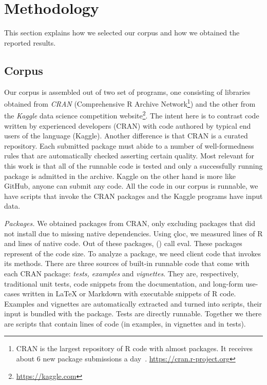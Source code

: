 \documentclass[screen,acmsmall]{acmart}
\newcommand{\mypara}[1]{\medskip\noindent\emph{#1}\xspace}
\begin{document}
\section{Methodology}

This section explains how we selected our corpus and how we obtained the
reported results.

\subsection{Corpus}

Our corpus is assembled out of two set of programs, one consisting of libraries
obtained from \emph{CRAN} (Comprehensive R Archive Network\footnote{CRAN is the
  largest repository of R code with almost \CranAvailablePackagesRnd packages.
  It receives about 6 new package submissions a day~\cite{Ligges2017}. \cf
  \url{https://cran.r-project.org}}) and the other from
the \emph{Kaggle} data science competition website\footnote{\cf
  \url{https://kaggle.com}}. The intent here is to contrast code written by
experienced developers (CRAN) with code authored by typical end users of the
language (Kaggle). Another difference is that CRAN is a curated repository. Each
submitted package must abide to a number of well-formedness rules that are
automatically checked asserting certain quality. Most relevant for this work is
that all of the runnable code is tested and only a successfully running package
is admitted in the archive. Kaggle on the other hand is more like GitHub, anyone
can submit any code. All the code in our corpus is runnable, \ie we have scripts
that invoke the CRAN packages and the Kaggle programs have input data.

\mypara{Packages.} We obtained \CranAllPackages packages from CRAN, only
excluding packages that did not install due to missing native dependencies.
Using \c{cloc}, we measured \CranAllRCodeRnd lines of R and
\CranAllNativeCodeRnd lines of native code. Out of these packages, \CranPackages
(\CranPackagesRatio) call eval. These packages represent \CranCodeRatio of the
code size. To analyze a package, we need client code that invokes its methods.
There are three sources of built-in runnable code that come with each CRAN
package: \emph{tests, examples} and \emph{vignettes}. They are, respectively,
traditional unit tests, code snippets from the documentation, and long-form
use-cases written in \LaTeX\xspace or Markdown with executable snippets of R
code. Examples and vignettes are automatically extracted and turned into
scripts, their input is bundled with the package. Tests are directly runnable.
Together we there are \CranRunnableScripts scripts that contain
\CranRunnableCode lines of code (\CranRunnableCodeExamplesRnd in examples,
\CranRunnableCodeVignettesRnd in vignettes and \CranRunnableCodeTestsRnd in
tests).
\end{document}
